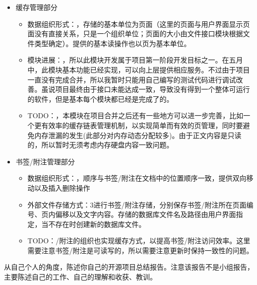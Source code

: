 \documentclass[a4paper,12pt]{article}
\begin{document}
\begin{CJK*}{UTF8}{song}
	\begin{itemize}
		\item{{缓存管理部分}}
			\begin{itemize}
				\item{数据组织形式：，存储的基本单位为页面（这里的页面与用户界面显示页面没有直接关系，只是一个组织单位；页面的大小由文件接口模块根据文件类型确定）。提供的基本读操作也以页为基本单位。}
				\item{模块进展：，所以此模块开发属于项目第一阶段开发目标之一。在五月中，此模块基本功能已经实现，可以向上层提供相应服务。不过由于项目一直没有完成合并，所以我暂时只能用自己编写的测试代码进行调试改善。虽说项目最终由于接口未能达成一致，导致没有得到一个整体可运行的软件，但是基本每个模块都已经是完成了的。}
				\item{TODO：，本模块在项目合并之后还有一些地方可以进一步完善，比如一个更有效率的缓存链表管理机制，以实现简单而有效的页管理，同时要避免内存泄漏的发生(此部分对内存动态分配较多)。由于正文内容是只读的，所以暂时无须考虑内存硬盘内容一致问题。}
			\end{itemize}
		\item{{书签/附注管理部分}}
			\begin{itemize}
				\item{数据组织形式：，顺序与书签/附注在文档中的位置顺序一致，提供双向移动以及插入删除操作}
				\item{外部文件存储方式：3进行书签/附注存储，分别保存书签/附注所在页面编号、页内偏移以及文字内容。存储的数据库文件名及路径由用户界面指定，当不存在时创建新的数据库文件。}
				\item{TODO：/附注的组织也实现缓存方式，以提高书签/附注访问效率。这里需要注意书签/附注是可读写的，所以需要注意更新时保持一致性的问题。}
			\end{itemize}
	\end{itemize}

	从自己个人的角度，陈述你自己的开源项目总结报告。注意该报告不是小组报告，主要陈述自己的工作、自己的理解和收获、教训。

\end{CJK*}
\end{document}
